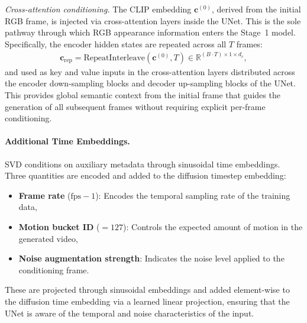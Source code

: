 \textit{Cross-attention conditioning.} The CLIP embedding $\mathbf{c}^{(0)}$, derived from the initial RGB frame, is injected via cross-attention layers inside the UNet. This is the sole pathway through which RGB appearance information enters the Stage~1 model. Specifically, the encoder hidden states are repeated across all $T$ frames:
\begin{align}
    \mathbf{c}_{\text{rep}} = \text{RepeatInterleave}(\mathbf{c}^{(0)}, T) \in \mathbb{R}^{(B \cdot T) \times 1 \times d_c},
    \label{eq:clip_repeat}
\end{align}
and used as key and value inputs in the cross-attention layers distributed across the encoder down-sampling blocks and decoder up-sampling blocks of the UNet. This provides global semantic context from the initial frame that guides the generation of all subsequent frames without requiring explicit per-frame conditioning.

\paragraph{Additional Time Embeddings.}
SVD conditions on auxiliary metadata through sinusoidal time embeddings. Three quantities are encoded and added to the diffusion timestep embedding:
\begin{itemize}
    \item \textbf{Frame rate} ($\text{fps} - 1$): Encodes the temporal sampling rate of the training data,
    \item \textbf{Motion bucket ID} ($= 127$): Controls the expected amount of motion in the generated video,
    \item \textbf{Noise augmentation strength}: Indicates the noise level applied to the conditioning frame.
\end{itemize}
These are projected through sinusoidal embeddings and added element-wise to the diffusion time embedding via a learned linear projection, ensuring that the UNet is aware of the temporal and noise characteristics of the input.

